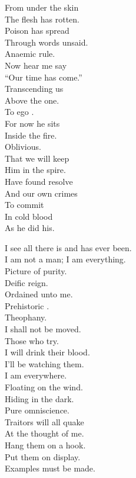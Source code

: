 From under the skin \\
The flesh has rotten. \\
Poison has spread \\
Through words unsaid. \\
Anaemic rule. \\
Now hear me say \\
``Our time has come.'' \\
Transcending us \\
Above the one. \\
To ego . \\
For now he sits \\
Inside the fire. \\
Oblivious. \\
That we will keep \\
Him in the spire. \\
Have found resolve \\
And our own crimes \\
To commit \\
In cold blood \\
As he did his. \\




I see all there is and has ever been. \\
I am not a man; I am everything. \\
Picture of purity. \\

Deific reign. \\
Ordained unto me. \\
Prehistoric . \\
Theophany. \\
I shall not be moved. \\
Those who try. \\
I will drink their blood. \\

I'll be watching them. \\
I am everywhere. \\
Floating on the wind. \\
Hiding in the dark. \\
Pure omniscience. \\
Traitors will all quake \\
At the thought of me. \\
Hang them on a hook. \\
Put them on display. \\
Examples must be made. \\

